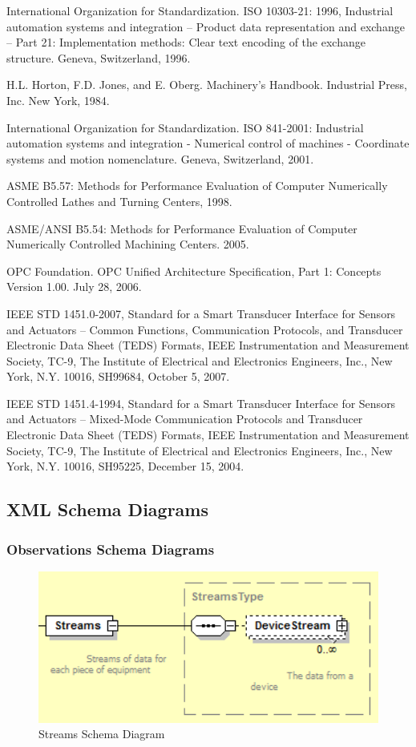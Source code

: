 International Organization for Standardization. ISO 10303-21: 1996, Industrial automation systems and integration -- Product data representation and exchange -- Part 21: Implementation methods: Clear text encoding of the exchange structure. Geneva, Switzerland, 1996.

H.L. Horton, F.D. Jones, and E. Oberg. Machinery's Handbook. Industrial Press, Inc. New York, 1984.

International Organization for Standardization. ISO 841-2001: Industrial automation systems and integration - Numerical control of machines - Coordinate systems and motion nomenclature. Geneva, Switzerland, 2001.

ASME B5.57: Methods for Performance Evaluation of Computer Numerically Controlled Lathes and Turning Centers, 1998.

ASME/ANSI B5.54: Methods for Performance Evaluation of Computer Numerically Controlled Machining Centers. 2005.

OPC Foundation. OPC Unified Architecture Specification, Part 1: Concepts Version 1.00. July 28, 2006.

IEEE STD 1451.0-2007, Standard for a Smart Transducer Interface for Sensors and Actuators – Common Functions, Communication Protocols, and Transducer Electronic Data Sheet (TEDS) Formats, IEEE Instrumentation and Measurement Society, TC-9, The Institute of Electrical and Electronics Engineers, Inc., New York, N.Y. 10016, SH99684, October 5, 2007.

IEEE STD 1451.4-1994, Standard for a Smart Transducer Interface for Sensors and Actuators – Mixed-Mode Communication Protocols and Transducer Electronic Data Sheet (TEDS) Formats, IEEE Instrumentation and Measurement Society, TC-9, The Institute of Electrical and Electronics Engineers, Inc., New York, N.Y. 10016, SH95225, December 15, 2004. \newpage 

\subsection{XML Schema Diagrams}
\label{sec:XML Schema Diagrams}

\subsubsection{Observations Schema Diagrams}
\label{sec:Observations Schema Diagrams}

\begin{figure}[ht]
  \centering
    \includegraphics[width=1.0\textwidth]{figures/Streams Schema.png}
  \caption{Streams Schema Diagram}
  \label{fig:Streams Schema Diagram}
\end{figure}

